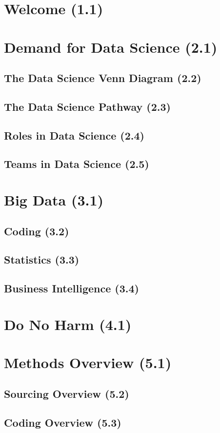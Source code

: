 \section{Welcome (1.1)}
\section{Demand for Data Science (2.1)}
\subsection{The Data Science Venn Diagram (2.2)}
\subsection{The Data Science Pathway (2.3)}
\subsection{Roles in Data Science (2.4)}
\subsection{Teams in Data Science (2.5)}
\section{Big Data (3.1)}
\subsection{Coding (3.2)}
\subsection{Statistics (3.3)}
\subsection{Business Intelligence (3.4)}
\section{Do No Harm (4.1)}
\section{Methods Overview (5.1)}
\subsection{Sourcing Overview (5.2)}
\subsection{Coding Overview (5.3)}
